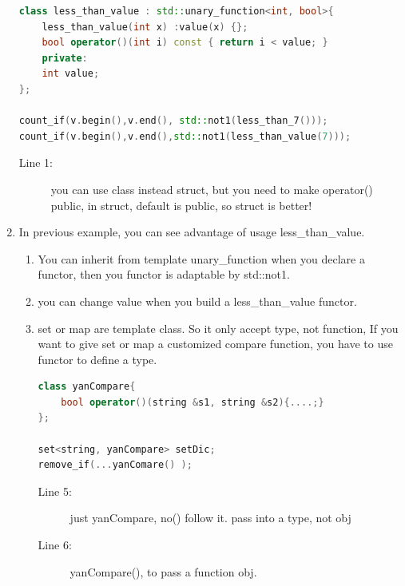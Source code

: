 \documentclass[a4paper,11pt,twoside]{book}
\begin{document}
\begin{enumerate}
\begin{lstlisting}[frame=single, language=c++]
class less_than_value : std::unary_function<int, bool>{
    less_than_value(int x) :value(x) {};
    bool operator()(int i) const { return i < value; }
    private:
    int value;
};

count_if(v.begin(),v.end(), std::not1(less_than_7()));
count_if(v.begin(),v.end(),std::not1(less_than_value(7)));
\end{lstlisting}
\begin{description}
	\item[Line 1:] you can use class instead struct, but you need to make operator() public, in struct, default is public, so struct is better!
\end{description}


   \item In previous example, you can see advantage of usage less\_than\_value.
   \begin{enumerate}
   \item You can inherit from  template unary\_function when you declare a functor, then you functor is adaptable by std::not1.

   \item you can change value when you build a less\_than\_value functor.

   \item set or map are template class. So it only accept type, not function, If you want to give set or map a customized compare function,  you have to use functor to define a type.
\begin{lstlisting}[frame=single, language=c++]
class yanCompare{
    bool operator()(string &s1, string &s2){....;}
};

set<string, yanCompare> setDic;
remove_if(...yanComare() );
\end{lstlisting}
\begin{description}
	\item[Line 5:] just yanCompare, no() follow it. pass into a type, not obj
	\item[Line 6:] yanCompare(), to pass a function obj.
\end{description}
 
\end{enumerate}


\end{enumerate}
\end{document}
